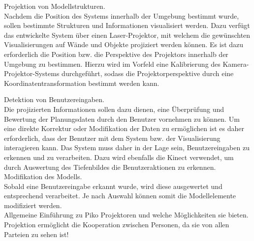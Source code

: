 Projektion von Modellstrukturen.\\
Nachdem die Position des Systems innerhalb der Umgebung bestimmt wurde, sollen bestimmte Strukturen und Informationen visualisiert werden. Dazu verfügt das entwickelte System über einen Laser-Projektor, mit welchem die gewünschten Visualisierungen auf Wände und Objekte projiziert werden können. Es ist dazu erforderlich die Position bzw. die Perspektive des Projektors innerhalb der Umgebung zu bestimmen. Hierzu wird im Vorfeld eine Kalibrierung des Kamera-Projektor-Systems durchgeführt, sodass die Projektorperspektive durch eine Koordinatentransformation bestimmt werden kann.

Detektion von Benutzereingaben.\\
Die projizierten Informationen sollen dazu dienen, eine Überprüfung und Bewertung der Planungsdaten durch den Benutzer vornehmen zu können. Um eine direkte Korrektur oder Modifikation der Daten zu ermöglichen ist es daher erforderlich, dass der Benutzer mit dem System bzw. der Visualisierung interagieren kann. Das System muss daher in der Lage sein, Benutzereingaben zu erkennen und zu verarbeiten. Dazu wird ebenfalls die Kinect verwendet, um durch Auswertung des Tiefenbildes die Benutzeraktionen zu erkennen.\\

Modifikation des Modells.\\
Sobald eine Benutzereingabe erkannt wurde, wird diese ausgewertet und entsprechend verarbeitet. Je nach Auswahl können somit die Modellelemente modifiziert werden.\\

Allgemeine Einführung zu Piko Projektoren und welche Möglichkeiten sie bieten.\\%
Projektion ermöglicht die Kooperation zwischen Personen, da sie von allen Parteien zu sehen ist!